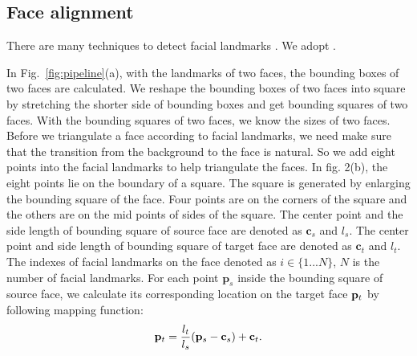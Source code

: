 \subsection{Face alignment}


%
There are many techniques to detect facial landmarks \cite{fld2,fld3,fld4,fld}. We adopt \cite{fld}. 

In Fig.~\ref{fig:pipeline}(a), with the landmarks of two faces, the bounding boxes of two faces are calculated. 
We reshape the bounding boxes of two faces into square by stretching the shorter side of bounding boxes and get bounding squares of two faces. 
With the bounding squares of two faces, we know the sizes of two faces.
%
% 
Before we triangulate a face according to facial landmarks, we need make sure that the transition from the background to the face is natural. 
%
So we add eight points into the facial landmarks to help triangulate the faces. In fig. 2(b), the eight points lie on the boundary of a square. The square is generated by enlarging the bounding square of the face. Four points are on the corners of the square and the others are on the mid points of sides of the square. 
%
The center point and the side length of bounding square of source face are denoted as $\mathbf{c}_s$ and $l_s$. 
The center point and side length of bounding square of target face are denoted as $\mathbf{c}_t$ and $l_t$.
% 
The indexes of facial landmarks on the face denoted as $i \in \{1...N\}$, $N$ is the number of facial landmarks. 
For each point $\mathbf{p}_s$ inside the bounding square of source face, we calculate its corresponding location on the target face $\mathbf{p}_t$ by following mapping function:
%
\begin{equation}
\label{eq:trans-point}
\mathbf{p}_t=\frac{l_t}{l_s}(\mathbf{p}_s-\mathbf{c}_s) + \mathbf{c}_t.
\end{equation}

